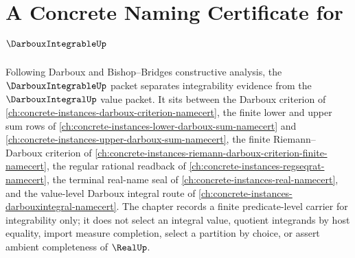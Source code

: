 \chapter{A Concrete Naming Certificate for $\DarbouxIntegrableUp$}
\label{ch:concrete-instances-darboux-integrable-namecert}

Following Darboux and Bishop--Bridges constructive analysis, the $\DarbouxIntegrableUp$ packet separates integrability evidence from the $\DarbouxIntegralUp$ value packet. It sits between the Darboux criterion of \autoref{ch:concrete-instances-darboux-criterion-namecert}, the finite lower and upper sum rows of \autoref{ch:concrete-instances-lower-darboux-sum-namecert} and \autoref{ch:concrete-instances-upper-darboux-sum-namecert}, the finite Riemann--Darboux criterion of \autoref{ch:concrete-instances-riemann-darboux-criterion-finite-namecert}, the regular rational readback of \autoref{ch:concrete-instances-regseqrat-namecert}, the terminal real-name seal of \autoref{ch:concrete-instances-real-namecert}, and the value-level Darboux integral route of \autoref{ch:concrete-instances-darbouxintegral-namecert}. The chapter records a finite predicate-level carrier for integrability only; it does not select an integral value, quotient integrands by host equality, import measure completion, select a partition by choice, or assert ambient completeness of $\RealUp$.


